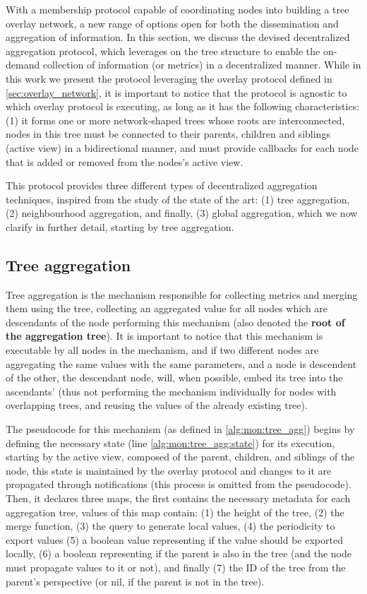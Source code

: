 
With a membership protocol capable of coordinating nodes into building a tree overlay network, a new range of options open for both the dissemination and aggregation of information. In this section, we discuss the devised decentralized aggregation protocol, which leverages on the tree structure to enable the on-demand collection of information (or metrics) in a decentralized manner. While in this work we present the protocol leveraging the overlay protocol defined in \ref{sec:overlay_network}, it is important to notice that the protocol is agnostic to which overlay protocol is executing, as long as it has the following characteristics: (1) it forms one or more network-shaped trees whose roots are interconnected, nodes in this tree must be connected to their parents, children and siblings (active view) in a bidirectional manner, and must provide callbacks for each node that is added or removed from the nodes's active view.

This protocol provides three different types of decentralized aggregation techniques, inspired from the study of the state of the art: (1) tree aggregation, (2) neighbourhood aggregation, and finally, (3) global aggregation, which we now clarify in further detail, starting by tree aggregation.

\subsection{Tree aggregation} \label{sec:mon_protocol:tree_agg}

Tree aggregation is the mechanism responsible for collecting metrics and merging them using the tree, collecting an aggregated value for all nodes which are descendants of the node performing this mechanism (also denoted the \textbf{root of the aggregation tree}). It is important to notice that this mechanism is executable by all nodes in the mechanism, and if two different nodes are aggregating the same values with the same parameters, and a node is descendent of the other, the descendant node, will, when possible, embed its tree into the ascendants' (thus not performing the mechanism individually for nodes with overlapping trees, and reusing the values of the already existing tree).

The pseudocode for this mechanism (as defined in \ref{alg:mon:tree_agg}) begins by defining the necessary state (line \ref{alg:mon:tree_agg:state}) for its execution, starting by the active view, composed of the parent, children, and siblings of the node, this state is maintained by the overlay protocol and changes to it are propagated through notifications (this process is omitted from the pseudocode). Then, it declares three maps, the first contains the necessary metadata for each aggregation tree, values of this map contain: (1) the height of the tree, (2) the merge function, (3) the query to generate local values, (4) the periodicity to export values (5) a boolean value representing if the value should be exported locally, (6) a boolean representing if the parent is also in the tree (and the node must propagate values to it or not), and finally (7) the ID of the tree from the parent's perspective (or nil, if the parent is not in the tree).

